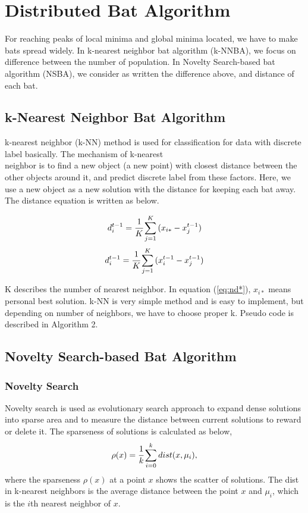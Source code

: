 \section{Distributed Bat Algorithm}
For reaching peaks of local minima and global minima located, we have to make bats spread widely. In k-nearest neighbor bat algorithm (k-NNBA), we focus on difference between the number of population. In Novelty Search-based bat algorithm (NSBA), we consider as written the difference above, and distance of each bat.
\subsection{k-Nearest Neighbor Bat Algorithm}
k-nearest neighbor (k-NN) method is used for classification for data with discrete label basically. The mechanism of k-nearest\\ neighbor is to find a new object (a new point) with closest distance between the other objects around it, and predict discrete label from these factors. Here, we use a new object as a new solution with the distance for keeping each bat away. The distance equation is written as below.

\begin{equation}
d_i^{t-1}=\cfrac{1}{K}\sum_{j=1}^K {(x_{i*}-x_j^{t-1})}
\label{eq:kd*}
\end{equation}
\begin{equation}
d_i^{t-1}=\cfrac{1}{K}\sum_{j=1}^K {(x_i^{t-1}-x_j^{t-1})}
\label{eq:kdi}
\end{equation}

K describes the number of nearest neighbor. In equation (\ref{eq:nd*}), ${x_{i*}}$ means personal best solution. k-NN is very simple method and is easy to implement, but depending on number of neighbors, we have to choose proper k. Pseudo code is described in Algorithm 2.

\subsection{Novelty Search-based Bat Algorithm}
\subsubsection{Novelty Search}
Novelty search is used as evolutionary search approach to expand dense solutions into sparse area and to measure the distance between current solutions to reward or delete it. The sparseness of solutions is calculated as below,
\begin{equation}
\rho(x)=\cfrac{1}{k}\sum_{i=0}^k dist(x,\mu_i),
\label{eq:nov}
\end{equation}
where the sparseness ${\rho(x)}$ at a point ${x}$ shows the scatter of solutions. The dist in k-nearest neighbors is the average distance between the point ${x}$ and ${\mu_i}$, which is the ${i}$th nearest neighbor of ${x}$. 

